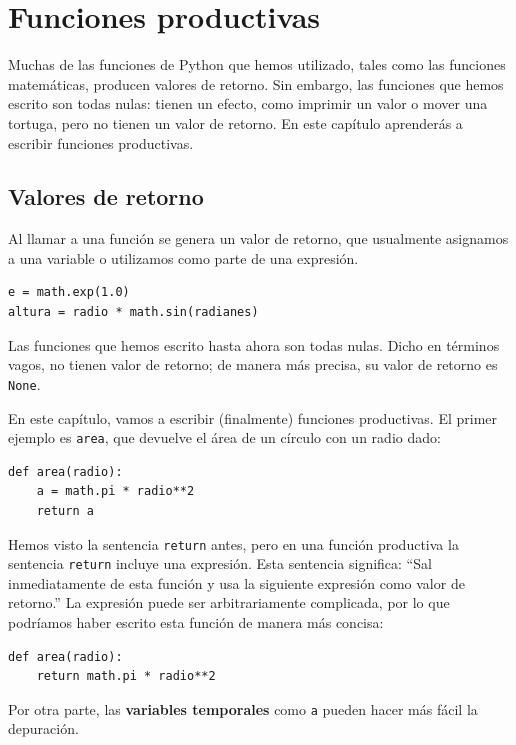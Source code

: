 \documentclass[10pt]{book}
\begin{document}
\chapter{Funciones productivas}
\label{fruitchap}

Muchas de las funciones de Python que hemos utilizado, tales como las funciones
matemáticas, producen valores de retorno. Sin embargo, las funciones que hemos escrito
son todas nulas: tienen un efecto, como imprimir un valor
o mover una tortuga, pero no tienen un valor de retorno.  En
este capítulo aprenderás a escribir funciones productivas.


\section{Valores de retorno}

Al llamar a una función se genera un valor de
retorno, que usualmente asignamos a una variable o utilizamos como parte de una
expresión.

\begin{verbatim}
e = math.exp(1.0)
altura = radio * math.sin(radianes)
\end{verbatim}
%
Las funciones que hemos escrito hasta ahora son todas nulas.  Dicho en términos vagos,
no tienen valor de retorno; de manera más precisa,
su valor de retorno es {\tt None}.

En este capítulo, vamos a escribir (finalmente) funciones productivas.
El primer ejemplo es {\tt area}, que devuelve el área de un círculo
con un radio dado:

\begin{verbatim}
def area(radio):
    a = math.pi * radio**2
    return a
\end{verbatim}
%
Hemos visto la sentencia {\tt return} antes, pero en una función
productiva la sentencia {\tt return} incluye
una expresión.  Esta sentencia significa: ``Sal inmediatamente de
esta función y usa la siguiente expresión como valor de retorno.''
La expresión puede ser arbitrariamente complicada, por lo que podríamos
haber escrito esta función de manera más concisa:

\begin{verbatim}
def area(radio):
    return math.pi * radio**2
\end{verbatim}
%
Por otra parte, las {\bf variables temporales} como {\tt a} pueden hacer
más fácil la depuración.
\end{document}
